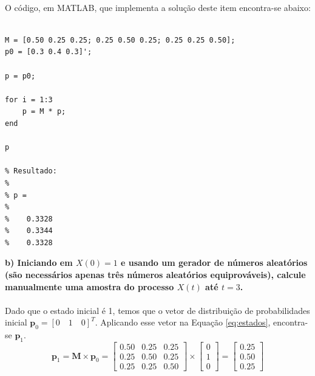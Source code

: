 \documentclass{report}
\begin{document}
\paragraph{} O código, em MATLAB, que implementa a solução deste item encontra-se abaixo:\\

\begin{lstlisting}

M = [0.50 0.25 0.25; 0.25 0.50 0.25; 0.25 0.25 0.50];
p0 = [0.3 0.4 0.3]';

p = p0;

for i = 1:3
    p = M * p;
end

p

% Resultado:
%
% p =
%
%    0.3328
%    0.3344
%    0.3328

\end{lstlisting}

\textbf{b) Iniciando em $X(0) = 1$ e usando um gerador de números aleatórios (são necessários apenas três números aleatórios equiprováveis), calcule manualmente uma amostra do processo $X(t)$ até $t = 3$.}\\

\paragraph{} Dado que o estado inicial é 1, temos que o vetor de distribuição de probabilidades inicial $\mathbf{p}_0 = [0 \quad 1 \quad 0]^T$. Aplicando esse vetor na Equação \eqref{eq:estados}, encontra-se $\mathbf{p}_1$.\\

\begin{equation*}
\mathbf{p}_1 = \mathbf{M} \times \mathbf{p}_0 = \left[ \begin{array}{ccc}
0.50 & 0.25 & 0.25 \\ 
0.25 & 0.50 & 0.25 \\ 
0.25 & 0.25 & 0.50 
\end{array} \right] \times \left[\begin{array}{c}
0 \\ 
1 \\ 
0
\end{array} \right] = \left[ \begin{array}{c}
0.25 \\ 
0.50 \\ 
0.25
\end{array}  \right]
\end{equation*}\\
\end{document}
